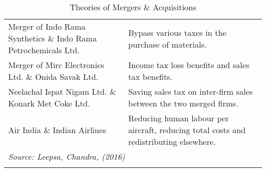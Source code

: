 \documentclass[11pt, english]{article}
\begin{document}
\begin{center}
\begin{longtable}{p{5cm}p{7.5cm}}
        \hline
        Merger of Indo Rama Synthetics \& Indo Rama Petrochemicals Ltd. & Bypass various taxes in the purchase of materials.\\
        Merger of Mirc Electronics Ltd. \& Onida Savak Ltd. & Income tax loss benefits and sales tax benefits.\\
        Neelachal Ispat Nigam Ltd. \& Konark Met Coke Ltd. & Saving sales tax on inter-firm sales between the two merged firms.\\
        Air India \& Indian Airlines & Reducing human labour per aircraft, reducing total costs and redistributing elsewhere.\\
        \hline
        \multicolumn{2}{p{13cm}}{\textit{Source: Leepsa, Chandra, (2016)}}\\
        \hline
        \caption{Theories of Mergers \& Acquisitions}
\end{longtable}
\end{center}

\newpage

\renewcommand\refname{Bibliography}
\end{document}
